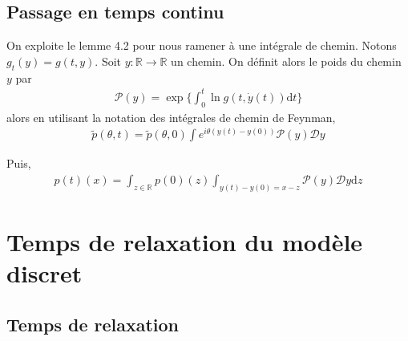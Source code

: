 \documentclass{article}
\theoremstyle{definition}
\begin{document}
\subsection{Passage en temps continu}
On exploite le lemme 4.2 pour nous ramener à une intégrale de chemin. Notons $g_t(y) = g(t,y)$. Soit $y : \mathbb{R}\to \mathbb{R}$ un chemin. On définit alors le poids du chemin $y$ par \begin{align*}
	\mathcal{P}(y) = \exp\{\int_{0}^t \ln g(t, \dot{y}(t))\mathrm{d}t\}
\end{align*}
alors en utilisant la notation des intégrales de chemin de Feynman,
\begin{align*}
	\tilde{p}(\theta, t) = \tilde{p}(\theta, 0)\int e^{i\theta (y(t)-y(0))}\mathcal{P}(y)\mathcal{D}y
\end{align*}

Puis,
\begin{align*}
	p(t)(x) = \int_{z\in\mathbb{R}}p(0)(z)\int_{y(t)-y(0)=x-z} \mathcal{P}(y)\mathcal{D}y\mathrm{d}z
\end{align*}
\section{Temps de relaxation du modèle discret}
\subsection{Temps de relaxation}
\end{document}
